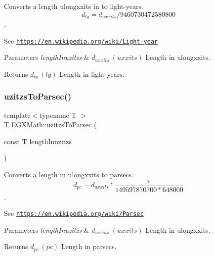 Converts a length ulongxxits in to light-\/years. \[ d_{ly}=d_{uxxits} / 9460730472580800 \]. 

See \href{https://en.wikipedia.org/wiki/Light-year}{\tt https\+://en.\+wikipedia.\+org/wiki/\+Light-\/year} 
\begin{DoxyParams}{Parameters}
{\em length\+Inuzitzs} & $ d_{uxxits}\ (uxxits)$ Length in ulongxxits. \\
\hline
\end{DoxyParams}
\begin{DoxyReturn}{Returns}
$ d_{ly}\ (ly)$ Length in light-\/years. 
\end{DoxyReturn}
\mbox{\label{group___e_g_x_math-_conversions-_length_conversions-uzitzs-_astronomical_ga028a17a589e3f3d0c09daa6fbe664989}} 
\subsubsection{\texorpdfstring{uzitzs\+To\+Parsec()}{uzitzsToParsec()}}
{\footnotesize\ttfamily template$<$typename T $>$ \\
T E\+G\+X\+Math\+::uzitzs\+To\+Parsec (\begin{DoxyParamCaption}\item[{const T}]{length\+Inuzitzs }\end{DoxyParamCaption})}



Converts a length in ulongxxits to parsecs. \[ d_{pc}=d_{uxxits} * \frac{\pi}{149597870700 * 648000} \]. 

See \href{https://en.wikipedia.org/wiki/Parsec}{\tt https\+://en.\+wikipedia.\+org/wiki/\+Parsec} 
\begin{DoxyParams}{Parameters}
{\em length\+Inuzitzs} & $ d_{uxxits}\ (uxxits)$ Length in ulongxxits. \\
\hline
\end{DoxyParams}
\begin{DoxyReturn}{Returns}
$ d_{pc}\ (pc)$ Length in parsecs. 
\end{DoxyReturn}
